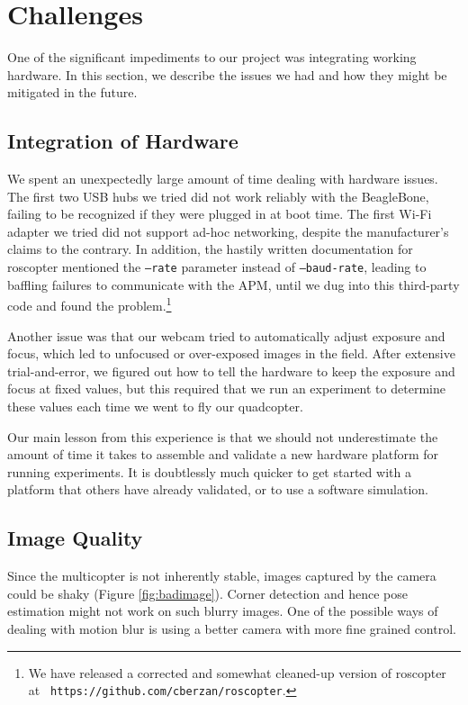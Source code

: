\documentclass[10pt]{scrartcl} %
\begin{document}
\section{Challenges}
One of the significant impediments to our project was integrating working
hardware. In this section, we describe the issues we had and how they might be
mitigated in the future.

\subsection{Integration of Hardware}

We spent an unexpectedly large amount of time dealing with hardware issues. The
first two USB hubs we tried did not work reliably with the BeagleBone, failing
to be recognized if they were plugged in at boot time. The first Wi-Fi adapter
we tried did not support ad-hoc networking, despite the manufacturer's claims
to the contrary. In addition, the hastily written documentation for roscopter
mentioned the {\tt --rate} parameter instead of {\tt --baud-rate}, leading to
baffling failures to communicate with the APM, until we dug into this
third-party code and found the problem.\footnote{We have released a corrected
and somewhat cleaned-up version of roscopter at {\tt
https://github.com/cberzan/roscopter}.}

Another issue was that our webcam tried to automatically adjust exposure and
focus, which led to unfocused or over-exposed images in the field. After
extensive trial-and-error, we figured out how to tell the hardware to keep the
exposure and focus at fixed values, but this required that we run an experiment
to determine these values each time we went to fly our quadcopter.

Our main lesson from this experience is that we should not underestimate the
amount of time it takes to assemble and validate a new hardware platform for
running experiments. It is doubtlessly much quicker to get started with a
platform that others have already validated, or to use a software simulation.

\subsection{Image Quality}

Since the multicopter is not inherently stable, images captured by the camera
could be shaky (Figure \ref{fig:badimage}).
Corner detection and hence pose estimation might not work on such blurry images.
One of the possible ways of dealing with motion blur is using a better camera
with more fine grained control.
\end{document}
